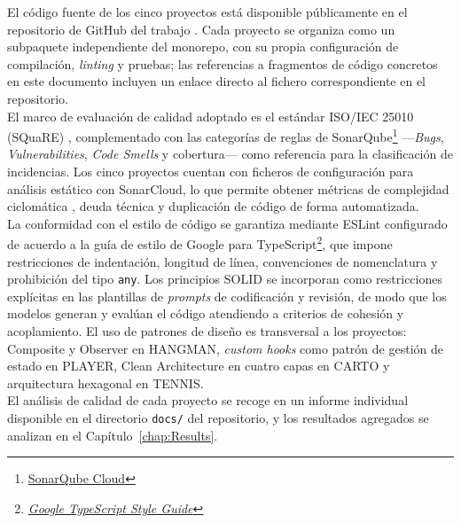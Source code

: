 El código fuente de los cinco proyectos está disponible públicamente en el repositorio de GitHub del trabajo \cite{URL::TFG}. Cada proyecto se organiza como un subpaquete independiente del monorepo, con su propia configuración de compilación, \textit{linting} y pruebas; las referencias a fragmentos de código concretos en este documento incluyen un enlace directo al fichero correspondiente en el repositorio.\\    

El marco de evaluación de calidad adoptado es el estándar ISO/IEC 25010 (SQuaRE) \cite{ISO:25010:2023}, complementado con las categorías de reglas de SonarQube\footnote{\href{https://sonarcloud.io}{SonarQube Cloud}} ---\textit{Bugs}, \textit{Vulnerabilities}, \textit{Code Smells} y cobertura--- como referencia para la clasificación de incidencias. Los cinco proyectos cuentan con ficheros de configuración para análisis estático con SonarCloud, lo que permite obtener métricas de complejidad ciclomática \cite{McCabe:1976:Complexity}, deuda técnica y duplicación de código de forma automatizada.\\ 

La conformidad con el estilo de código se garantiza mediante ESLint configurado de acuerdo a la guía de estilo de Google para TypeScript\footnote{\href{https://google.github.io/styleguide/tsguide.html}{\textit{Google TypeScript Style Guide}}}, que impone restricciones de indentación, longitud de línea, convenciones de nomenclatura y prohibición del tipo \texttt{any}. Los principios \ac{SOLID} \cite{Martin:2003:Agile} se incorporan como restricciones explícitas en las plantillas de \textit{prompts} de codificación y revisión, de modo que los modelos generan y evalúan el código atendiendo a criterios de cohesión y acoplamiento. El uso de patrones de diseño \cite{Gamma:1994:Design} es transversal a los proyectos: Composite y Observer en \ac{HANGMAN}, \textit{custom hooks} como patrón de gestión de estado en \ac{PLAYER}, Clean Architecture en cuatro capas en \ac{CARTO} y arquitectura hexagonal en \ac{TENNIS}.\\   

El análisis de calidad de cada proyecto se recoge en un informe individual disponible en el directorio \texttt{docs/} del repositorio, y los resultados agregados se analizan en el Capítulo~\ref{chap:Results}.

